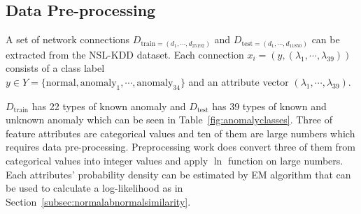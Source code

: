 
\subsection{Data Pre-processing}
\label{subsec:preprocessing}
A set of network connections $D_{\text{train}=(d_1, \cdots, d_{25192})}$ and $D_{\text{test}=(d_1, \cdots, d_{11850})}$ can be extracted from the NSL-KDD dataset. 
Each connection $x_i = (y, (\lambda_{1}, \cdots, \lambda_{39}))$ consists of a class label \\ 
$y \in Y=\{\text{normal},\text{anomaly}_1,\cdots,\text{anomaly}_{34}\}$ and an attribute vector $(\lambda_1,\cdots,\lambda_{39})$. 

$D_{\text{train}}$ has 22 types of known anomaly and $D_{\text{test}}$ has 39 types of known and unknown anomaly which can be seen in Table~\ref{fig:anomalyclasses}. 
Three of feature attributes are categorical values and ten of them are large numbers which requires data pre-processing. 
Preprocessing work does convert three of them from categorical values into integer values and apply $\ln$ function on large numbers. 
Each attributes' probability density can be estimated by EM algorithm that can be used to calculate a log-likelihood as in Section~\ref{subsec:normalabnormalsimilarity}. 

